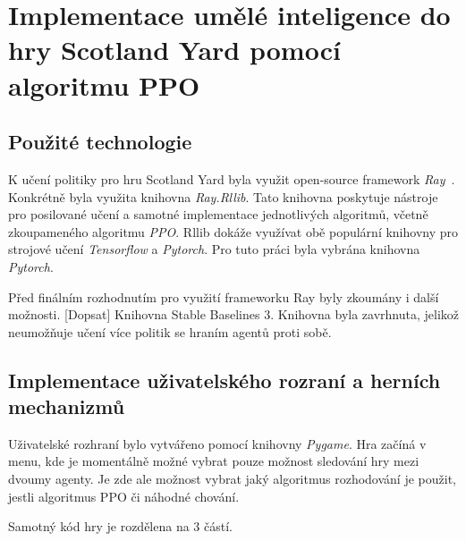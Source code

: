 \section*{Implementace umělé inteligence do hry Scotland Yard pomocí algoritmu PPO}
\label{sec:implementace}

\subsection{Použité technologie}\label{subsec:pouzite-technologie}
K učení politiky pro hru Scotland Yard byla využit open-source framework \emph{Ray}~\cite{Ray}.
Konkrétně byla využita knihovna \emph{Ray.Rllib}.
Tato knihovna poskytuje nástroje pro posilované učení a samotné implementace jednotlivých algoritmů, včetně zkoupameného algoritmu \emph{PPO}.
Rllib dokáže využívat obě populární knihovny pro strojové učení \emph{Tensorflow} a \emph{Pytorch}.
Pro tuto práci byla vybrána knihovna \emph{Pytorch}.

Před finálním rozhodnutím pro využití frameworku Ray byly zkoumány i další možnosti.
{\color{red}[Dopsat]}
Knihovna Stable Baselines 3.
Knihovna byla zavrhnuta, jelikož neumožňuje učení více politik se hraním agentů proti sobě.

\subsection{Implementace uživatelského rozraní a herních mechanizmů}\label{subsec:implementace-uzivatelskeho-rozrani-a-hernich-mechanizmu}

Uživatelské rozhraní bylo vytvářeno pomocí knihovny \emph{Pygame}.
Hra začíná v menu, kde je momentálně možné vybrat pouze možnost sledování hry mezi dvoumy agenty.
Je zde ale možnost vybrat jaký algoritmus rozhodování je použit, jestli algoritmus PPO či náhodné chování.

Samotný kód hry je rozdělena na 3 částí.

